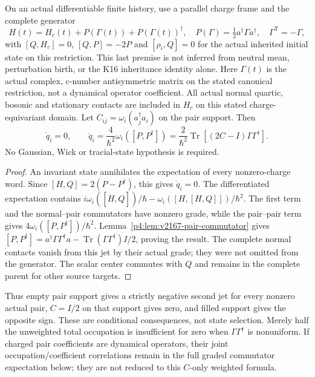 \documentclass[12pt,a4paper]{article}
\begin{document}
\begin{theorem}
\label{p5c:thm:next187-complete-nontracial-charge-jet}
On an actual differentiable finite history, use a parallel charge frame and
the complete generator
\[
 H(t)=H_c(t)+P(\Gamma(t))+P(\Gamma(t))^\dagger,
 \quad P(\Gamma)=\tfrac12a^\dagger\Gamma a^\dagger,
 \quad \Gamma^{\mathsf T}=-\Gamma,
\]
with $[Q,H_c]=0$, $[Q,P]=-2P$ and $[\rho_i,Q]=0$ for the actual
inherited initial state on this restriction. This last premise is not inferred
from neutral mean, perturbation birth, or the K16 inheritance identity alone.
Here $\Gamma(t)$ is the actual complex, c-number antisymmetric matrix
on the stated canonical restriction, not a dynamical operator coefficient.
All actual normal quartic, bosonic and stationary contacts are included in
$H_c$ on this stated charge-equivariant domain. Let
$C_{ij}=\omega_i(a_j^\dagger a_i)$ on the pair support. Then
\begin{equation}
 \boxed{\dot q_i=0,\qquad
 \ddot q_i=\frac4{\hbar^2}\omega_i([P,P^\dagger])
 =\frac2{\hbar^2}\operatorname{Tr}[(2C-I)\Gamma\Gamma^\dagger].}
 \label{p5c:eq:next187-complete-initial-charge-jet}
\end{equation}
No Gaussian, Wick or tracial-state hypothesis is required.
\end{theorem}
\begin{proof}
An invariant state annihilates the expectation of every nonzero-charge
word. Since $[H,Q]=2(P-P^\dagger)$, this gives $\dot q_i=0$.
The differentiated expectation contains
$i\omega_i([\dot H,Q])/\hbar-\omega_i([H,[H,Q]])/\hbar^2$.
The first term and the normal--pair commutators have nonzero grade, while
the pair--pair term gives $4\omega_i([P,P^\dagger])/\hbar^2$.
Lemma~\ref{p4:lem:v2167-pair-commutator} gives
$[P,P^\dagger]=a^\dagger\Gamma\Gamma^\dagger a
-\operatorname{Tr}(\Gamma\Gamma^\dagger)I/2$, proving the result.
The complete normal contacts vanish from this jet by their actual grade;
they were not omitted from the generator. The scalar center commutes with
$Q$ and remains in the complete parent for other source targets.
\end{proof}
Thus empty pair support gives a strictly negative second jet for every
nonzero actual pair, $C=I/2$ on that support gives zero, and filled support
gives the opposite sign. These are conditional consequences, not state
selection. Merely half the unweighted total occupation is insufficient for
zero when $\Gamma\Gamma^\dagger$ is nonuniform.
If charged pair coefficients are dynamical operators, their joint
occupation/coefficient correlations remain in the full graded commutator
expectation below; they are not reduced to this $C$-only weighted formula.
\end{document}
